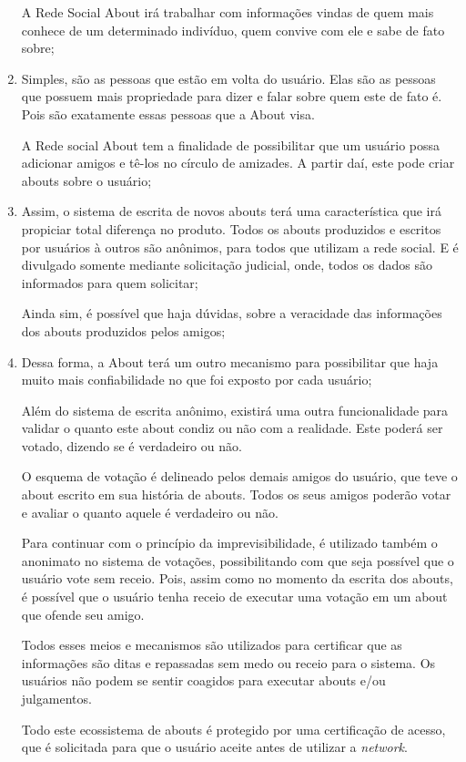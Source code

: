\begin{enumerate}
        A Rede Social About irá trabalhar com informações vindas de quem mais conhece de um determinado
        indivíduo, quem convive com ele e sabe de fato sobre; 
    \item Simples, são as pessoas que estão em volta do usuário. Elas são as pessoas que possuem mais propriedade para dizer
        e falar sobre quem este de fato é. Pois são exatamente essas pessoas que a About visa.

        A Rede social About tem a finalidade de possibilitar que um usuário possa adicionar amigos  e tê-los no círculo de amizades.
        A partir daí, este pode criar abouts sobre o usuário;

    \item Assim, o sistema de escrita de novos abouts terá uma característica que irá propiciar total diferença
        no produto. Todos os abouts produzidos e escritos por usuários à outros são anônimos, para todos
        que utilizam a rede social. E é divulgado somente mediante solicitação judicial, onde, todos
        os dados são informados para quem solicitar;


        Ainda sim, é possível que haja dúvidas, sobre a veracidade das informações dos abouts produzidos pelos amigos;

    \item Dessa forma, a About terá um outro mecanismo para possibilitar que haja muito mais confiabilidade no que foi exposto
        por cada usuário;

        Além do sistema de escrita anônimo, existirá uma outra funcionalidade para validar o quanto este about condiz ou não
        com a realidade. Este poderá ser votado, dizendo se é verdadeiro ou não. 

O esquema de votação é delineado pelos demais amigos do usuário, que teve o about escrito em sua história de abouts.
Todos os seus amigos poderão votar e avaliar o quanto aquele é verdadeiro ou não.

Para continuar com o princípio da imprevisibilidade, é utilizado também o anonimato no sistema de votações, possibilitando
com que seja possível que o usuário vote sem receio. Pois, assim como no momento da escrita dos abouts, é possível que o 
usuário tenha receio de executar uma votação em um about que ofende seu amigo.

Todos esses meios e mecanismos são utilizados para certificar que as informações são ditas e repassadas sem medo
ou receio para o sistema. Os usuários não podem se sentir coagidos para executar abouts e/ou julgamentos. 

Todo este ecossistema de abouts é protegido por uma certificação de acesso, que é solicitada para que o usuário
aceite antes de utilizar a \textit{network}.
\end{enumerate}

